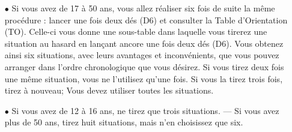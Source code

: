 \documentclass[11pt,twoside,a4paper]{article}
\begin{document}
\begin{multicols*}{2}
\begin{itemize}
	\item[$\bullet$] Si vous avez de 17 {\`a} 50 ans, vous allez r{\'e}aliser six fois de suite la m{\^e}me proc{\'e}dure : lancer une fois deux d{\'e}s (D6) et consulter la Table d'Orientation (TO). Celle-ci vous donne une sous-table dans laquelle vous tirerez une situation au hasard en lan\c{c}ant ancore une fois deux d{\'e}s (D6). Vous obtenez ainsi six situations, avec leurs avantages et inconv{\'e}nients, que vous pouvez arranger dans l'ordre chronologique que vous d{\'e}sirez. Si vous tirez deux fois une m{\^e}me situation, vous ne l'utilisez qu'une fois. Si vous la tirez trois fois, tirez {\`a} nouveau; Vous devez utiliser toutes les situations. 
	\item[$\bullet$] Si vous avez de 12 {\`a} 16 ans, ne tirez que trois situations. --- Si vous avez plus de 50 ans, tirez huit situations, mais n'en choisissez que six. 
\end{itemize} ~\\


\end{multicols*}
\end{document}
